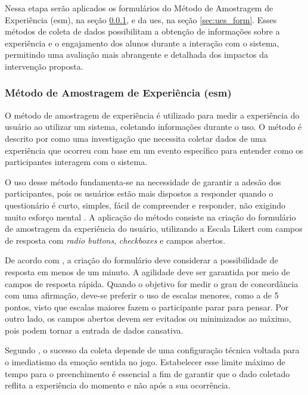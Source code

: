 Nessa etapa serão aplicados os formulários do Método de Amostragem de
Experiência (\gls{esm}), na seção \ref{sec:esm_form}, e da \gls{ues},
na seção \ref{sec:ues_form}. Esses métodos de coleta de dados possibilitam a obtenção de
informações sobre a experiência e o engajamento dos alunos durante a interação
com o sistema, permitindo uma avaliação mais abrangente e detalhada dos impactos
da intervenção proposta.

\subsubsection{Método de Amostragem de Experiência (\texorpdfstring{\acrshort{esm}}{ESM})}
\label{sec:esm_form}
O método de amostragem de experiência é utilizado para medir a experiência do
usuário ao utilizar um sistema, coletando informações durante o uso. O método é descrito
por  como uma investigação que necessita coletar dados de
uma experiência que ocorreu com base em um evento específico para entender como
os participantes interagem com o sistema.

O uso desse método fundamenta-se na necessidade de garantir a adesão dos
participantes, pois os usuários estão mais dispostos a responder quando o
questionário é curto, simples, fácil de compreender e responder, não exigindo
muito esforço mental \cite{francisco2020esm}. A aplicação do método consiste na
criação do formulário de amostragem da experiência do usuário, utilizando a
Escala Likert com campos de resposta com \textit{radio buttons}, \textit{checkboxes} e campos
abertos. 

De acordo com , a criação do formulário deve considerar a
possibilidade de resposta em menos de um minuto. A agilidade deve ser garantida
por meio de campos de resposta rápida. Quando o objetivo for medir o grau de
concordância com uma afirmação, deve-se preferir o uso de escalas menores, como
a de 5 pontos, visto que escalas maiores fazem o participante parar para pensar.
Por outro lado, os campos abertos devem ser evitados ou minimizados ao máximo,
pois podem tornar a entrada de dados cansativa.

Segundo , o sucesso da coleta depende de uma
configuração técnica voltada para o imediatismo da emoção sentida no jogo.
Estabelecer esse limite máximo de tempo para o preenchimento é essencial a fim
de garantir que o dado coletado reflita a experiência do momento e não após a
sua ocorrência.

